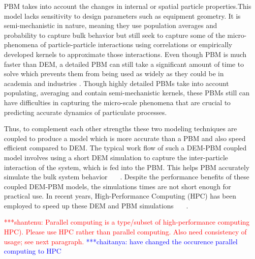 \documentclass[preprint,11pt,authoryear]{elsarticle}
\newcommand{\jhanote}[1]{ {\textcolor{red} { ***shantenu: #1 }}}
\newcommand{\csnote}[1]{ {\textcolor{blue} { ***chaitanya: #1 }}}
\newcommand{\gpnote}[1]{{\textcolor{green} {***giannis: #1}}}
\newcommand{\jhanote}[1]{}
\newcommand{\csnote}[1]{}
\newcommand{\gpnote}[1]{}
\begin{document}
PBM takes into account the changes in internal or spatial particle
properties.This model lacks sensitivity to design parameters such as equipment
geometry. It is semi-mechanistic in nature, meaning they use population
averages and probability to capture bulk behavior but still seek to capture
some of the micro-phenomena of particle-particle interactions using
correlations or empirically developed kernels to approximate those
interactions. Even though PBM is much faster than DEM, a detailed PBM can
still take a significant amount of time to solve which prevents them from
being used as widely as they could be in academia and industries
\citep{Barrasso2013}. Though highly detailed PBMs take into account
populating, averaging and contain semi-mechanistic kernels, these PBMs still
can have difficulties in capturing the micro-scale phenomena that are crucial
to predicting accurate dynamics of particulate processes.

Thus, to complement each other strengths these two modeling techniques are 
coupled to produce a model which is more accurate than a PBM and also speed  
efficient compared to DEM. The typical work flow of such a
DEM-PBM coupled model involves using a short DEM simulation to capture the
inter-particle interaction of the system, which is fed into the PBM. This helps 
PBM accurately simulate the bulk system behavior~\citep{Goldschmidt2003}
~\citep{Reinhold2012}~\citep{Barrasso2013}. Despite the performance benefits of
these coupled DEM-PBM models, the simulations times are not short enough for 
practical use. In recent years, High-Performance Computing (HPC) has 
been employed to speed up  these DEM and PBM simulations
~\citep{Gunawan2008}~\citep{Prakash2013a}~\citep{Bettencourt2017}.

\jhanote{Parallel computing is a type/subset of high-performance computing
HPC). Please use HPC rather than parallel computing. Also need consistency of
usage; see next paragraph.} \csnote{have changed the occurence parallel computing to HPC}


\end{document}
